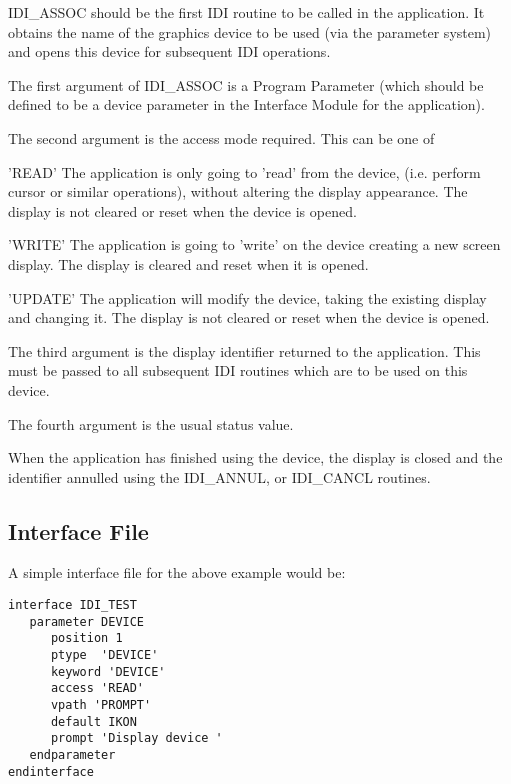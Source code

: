 IDI\_ASSOC should be the first IDI routine to be called in the application.
It obtains the name of the graphics device to be used (via the parameter
system) and opens this device for subsequent IDI operations.

The first argument of IDI\_ASSOC is a Program Parameter (which should be
defined to be a device parameter in the Interface Module for the
application).

The second argument is the access mode required. This can be one of

\hspace*{20mm}\begin{minipage}{140mm}

\noindent
'READ' The application is only going to 'read' from the device, (i.e.
perform cursor or similar operations), without altering the display
appearance. The display is not cleared or reset when the device is
opened.

'WRITE' The application is going to 'write' on the device creating
a new screen display. The display is cleared and reset when it
is opened.

'UPDATE' The application will modify the device, taking the existing
display and changing it. The display is not cleared or reset when the
device is opened.

\end{minipage}

The third argument is the display identifier returned to the application.
This must be passed to all subsequent IDI routines which are to be used
on this device.

The fourth argument is the usual status value.

When the application has finished using the device, the display is closed
and the identifier annulled using the IDI\_ANNUL, or IDI\_CANCL routines.

\subsection{Interface File}

A simple interface file for the above example would be:

\begin{small}
\begin{verbatim}
interface IDI_TEST
   parameter DEVICE
      position 1
      ptype  'DEVICE'
      keyword 'DEVICE'
      access 'READ'
      vpath 'PROMPT'
      default IKON
      prompt 'Display device '
   endparameter
endinterface
\end{verbatim}
\end{small}

